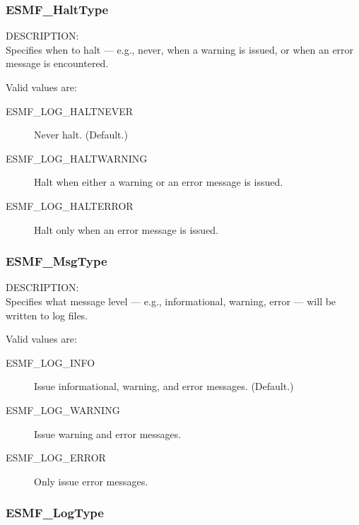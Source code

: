 

\subsubsection{ESMF\_HaltType}

\label{opt:Halttype}
{\sf DESCRIPTION:\\}
Specifies when to halt --- e.g., never, when a warning is issued, or when an
error message is encountered.

Valid values are:
\begin{description}
   \item [ESMF\_LOG\_HALTNEVER] 
         Never halt.  (Default.)
   \item [ESMF\_LOG\_HALTWARNING]
         Halt when either a warning or an error message is issued.
   \item [ESMF\_LOG\_HALTERROR]
         Halt only when an error message is issued.
\end{description}

\subsubsection{ESMF\_MsgType}

\label{opt:msgtype}
{\sf DESCRIPTION:\\}
Specifies what message level --- e.g., informational, warning, 
error --- will be written to log files.

Valid values are:
\begin{description}
   \item [ESMF\_LOG\_INFO] 
         Issue informational, warning, and error messages.  (Default.)
   \item [ESMF\_LOG\_WARNING]
         Issue warning and error messages.
   \item [ESMF\_LOG\_ERROR]
         Only issue error messages.
\end{description}

\subsubsection{ESMF\_LogType}

